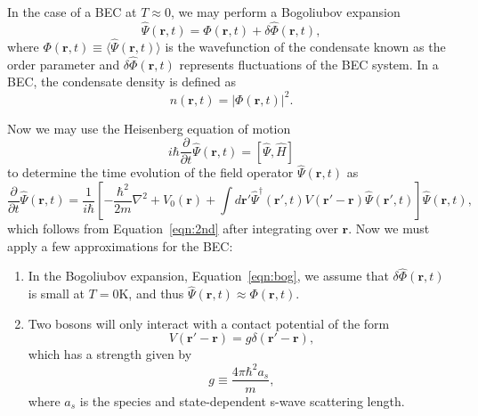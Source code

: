 In the case of a BEC at $T\approx0$, we may perform a Bogoliubov expansion~\cite{bogoliubov1947, dalfovo1999}
\begin{equation}
    \hat \Psi (\mathbf{r}, t) = \Phi(\mathbf{r},t) + \delta \hat \Phi(\mathbf{r},t),
\label{eqn:bog}
\end{equation}
where $\Phi(\mathbf{r},t) \equiv \langle \hat \Psi(\mathbf{r},t) \rangle$ is the wavefunction of the condensate known as the order parameter and $\delta \hat \Phi(\mathbf{r},t)$ represents fluctuations of the BEC system.
In a BEC, the condensate density is defined as
\begin{equation}
    n(\mathbf{r},t) = |\Phi(\mathbf{r},t)|^2.
\end{equation}

Now we may use the Heisenberg equation of motion
\begin{equation}
    i\hbar \frac{\partial}{\partial t}\hat \Psi(\mathbf{r},t) = [\hat \Psi, \hat H]
\end{equation}
    to determine the time evolution of the field operator $\hat \Psi(\mathbf{r},t)$ as
\begin{equation}
    \frac{\partial}{\partial t}\hat \Psi(\mathbf{r},t) = \frac{1}{i\hbar}\left[-\frac{\hbar^2}{2m}\nabla^2 + V_0(\mathbf{r}) + \int d\mathbf{r'} \hat \Psi^\dagger(\mathbf{r'}, t)V(\mathbf{r'} -\mathbf{r})\hat \Psi(\mathbf{r'},t)\right]\hat \Psi(\mathbf{r},t),
\end{equation}
which follows from Equation~\eqref{eqn:2nd} after integrating over $\mathbf{r}$. 
Now we must apply a few approximations for the BEC:
\begin{enumerate}
    \item In the Bogoliubov expansion, Equation~\eqref{eqn:bog}, we assume that $\delta \hat \Phi(\mathbf{r},t)$ is small at $T = 0\text{K}$, and thus $\hat \Psi(\mathbf{r},t) \approx \Phi(\mathbf{r},t)$. 
    \item Two bosons will only interact with a contact potential of the form
    \begin{equation}
        V(\mathbf{r'}-\mathbf{r}) = g\delta(\mathbf{r'} - \mathbf{r}),
    \end{equation}
    which has a strength given by
    \begin{equation}
        g \equiv \frac{4 \pi \hbar^2 a_s}{m},
    \end{equation}
    where $a_s$ is the species and state-dependent s-wave scattering length.
\end{enumerate}

